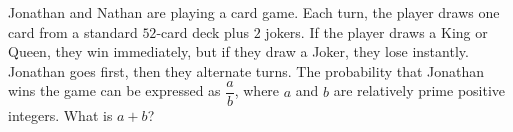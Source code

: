 Jonathan and Nathan are playing a card game. Each turn, the player draws one card from a standard $52$-card deck plus $2$ jokers. If the player draws a King or Queen, they win immediately, but if they draw a Joker, they lose instantly. Jonathan goes first, then they alternate turns. The probability that Jonathan wins the game can be expressed as $\dfrac{a}{b}$, where $a$ and $b$ are relatively prime positive integers. What is $a+b$?
